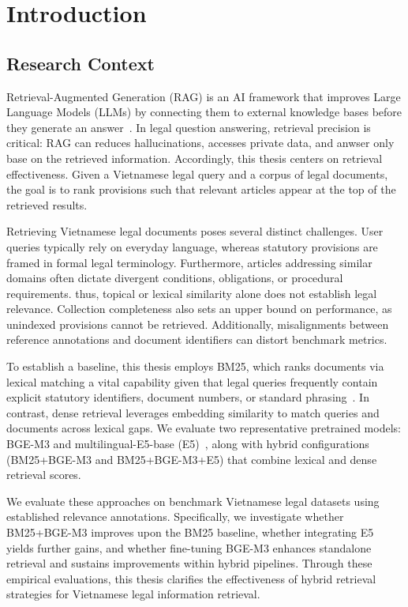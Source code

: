 \chapter{Introduction}

\section{Research Context}
Retrieval-Augmented Generation (RAG) is an AI framework that improves Large Language Models (LLMs) by connecting them to external knowledge bases before they generate an answer~\cite{lewis2020}. In legal question answering, retrieval precision is critical: RAG can reduces hallucinations, accesses private data, and anwser only base on the retrieved information. Accordingly, this thesis centers on retrieval effectiveness. Given a Vietnamese legal query and a corpus of legal documents, the goal is to rank provisions such that relevant articles appear at the top of the retrieved results.

Retrieving Vietnamese legal documents poses several distinct challenges. User queries typically rely on everyday language, whereas statutory provisions are framed in formal legal terminology. Furthermore, articles addressing similar domains often dictate divergent conditions, obligations, or procedural requirements. thus, topical or lexical similarity alone does not establish legal relevance. Collection completeness also sets an upper bound on performance, as unindexed provisions cannot be retrieved. Additionally, misalignments between reference annotations and document identifiers can distort benchmark metrics. 

To establish a baseline, this thesis employs BM25, which ranks documents via lexical matching a vital capability given that legal queries frequently contain explicit statutory identifiers, document numbers, or standard phrasing~\cite{robertson2009,rosa2021}. In contrast, dense retrieval leverages embedding similarity to match queries and documents across lexical gaps. We evaluate two representative pretrained models: BGE-M3 and multilingual-E5-base (E5)~\cite{chen2024,wang2024}, along with hybrid configurations (BM25+BGE-M3 and BM25+BGE-M3+E5) that combine lexical and dense retrieval scores.

We evaluate these approaches on benchmark Vietnamese legal datasets using established relevance annotations. Specifically, we investigate whether BM25+BGE-M3 improves upon the BM25 baseline, whether integrating E5 yields further gains, and whether fine-tuning BGE-M3 enhances standalone retrieval and sustains improvements within hybrid pipelines. Through these empirical evaluations, this thesis clarifies the effectiveness of hybrid retrieval strategies for Vietnamese legal information retrieval.

